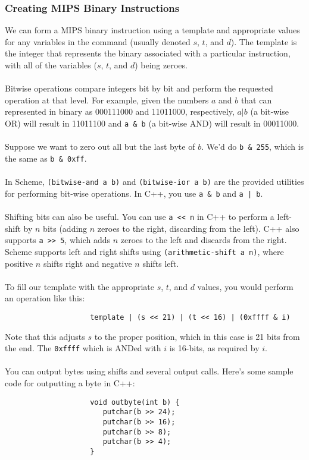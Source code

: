 \documentclass[]{article}
\theoremstyle{definition}
\begin{document}
			\subsubsection{Creating MIPS Binary Instructions}
				We can form a MIPS binary instruction using a template and appropriate values for any variables in the command (usually denoted $s$, $t$, and $d$). The template is the integer that represents the binary associated with a particular instruction, with all of the variables ($s$, $t$, and $d$) being zeroes. 
				\\ \\
				Bitwise operations compare integers bit by bit and perform the requested operation at that level. For example, given the numbers $a$ and $b$ that can represented in binary as 000111000 and 11011000, respectively, $a | b$ (a bit-wise OR) will result in 11011100 and \verb+a & b+ (a bit-wise AND) will result in 00011000. 
				\\ \\
				Suppose we want to zero out all but the last byte of $b$. We'd do \verb+b & 255+, which is the same as \verb+b & 0xff+.
				\\ \\
				In Scheme, \verb+(bitwise-and a b)+ and \verb+(bitwise-ior a b)+ are the provided utilities for performing bit-wise operations. In C++, you use \verb+a & b+ and \verb+a | b+.
				\\ \\
				Shifting bits can also be useful. You can use \verb+a << n+ in C++ to perform a left-shift by $n$ bits (adding $n$ zeroes to the right, discarding from the left). C++ also supports \verb+a >> 5+, which adds $n$ zeroes to the left and discards from the right. Scheme supports left and right shifts using \verb+(arithmetic-shift a n)+, where positive $n$ shifts right and negative $n$ shifts left.
				\\ \\
				To fill our template with the appropriate $s$, $t$, and $d$ values, you would perform an operation like this:
				\begin{verbatim}
					template | (s << 21) | (t << 16) | (0xffff & i)
				\end{verbatim}
				Note that this adjusts $s$ to the proper position, which in this case is 21 bits from the end. The \verb+0xffff+ which is ANDed with $i$ is 16-bits, as required by $i$.
				\\ \\
				You can output bytes using shifts and several output calls. Here's some sample code for outputting a byte in C++:
				\begin{verbatim}
					void outbyte(int b) {
					   putchar(b >> 24);
					   putchar(b >> 16);
					   putchar(b >> 8);
					   putchar(b >> 4);
					}
				\end{verbatim}
\end{document}
